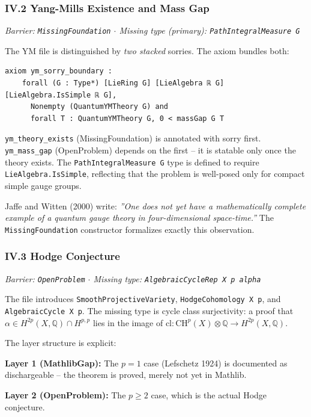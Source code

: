 \documentclass[12pt,a4paper]{article}
\begin{document}
\subsubsection{IV.2 Yang-Mills Existence and Mass Gap}

\emph{Barrier: \texttt{MissingFoundation} $\cdot$ Missing type (primary): \texttt{PathIntegralMeasure G}}

The YM file is distinguished by \emph{two stacked} sorries. The axiom bundles both:

\begin{lstlisting}[language=lean]
axiom ym_sorry_boundary :
    forall (G : Type*) [LieRing G] [LieAlgebra ℝ G] [LieAlgebra.IsSimple ℝ G],
      Nonempty (QuantumYMTheory G) and
      forall T : QuantumYMTheory G, 0 < massGap G T
\end{lstlisting}

\texttt{ym\_theory\_exists} (MissingFoundation) is annotated with sorry first. \texttt{ym\_mass\_gap} (OpenProblem) depends on the first  --  it is statable only once the theory exists. The \texttt{PathIntegralMeasure G} type is defined to require \texttt{LieAlgebra.IsSimple}, reflecting that the problem is well-posed only for compact simple gauge groups.

Jaffe and Witten (2000) write: \emph{''One does not yet have a mathematically complete example of a quantum gauge theory in four-dimensional space-time.''} The \texttt{MissingFoundation} constructor formalizes exactly this observation.

\subsubsection{IV.3 Hodge Conjecture}

\emph{Barrier: \texttt{OpenProblem} $\cdot$ Missing type: \texttt{AlgebraicCycleRep X p alpha}}

The file introduces \texttt{SmoothProjectiveVariety}, \texttt{HodgeCohomology X p}, and \texttt{AlgebraicCycle X p}. The missing type is cycle class surjectivity: a proof that $\alpha \in H^{2p}(X,\mathbb{Q}) \cap H^{p,p}$ lies in the image of $\text{cl} : \text{CH}^p(X) \otimes \mathbb{Q} \to H^{2p}(X,\mathbb{Q})$.

The layer structure is explicit:

\textbf{Layer 1 (MathlibGap):} The $p = 1$ case (Lefschetz 1924) is documented as dischargeable  --  the theorem is proved, merely not yet in Mathlib.

\textbf{Layer 2 (OpenProblem):} The $p \geq 2$ case, which is the actual Hodge conjecture.
\end{document}

